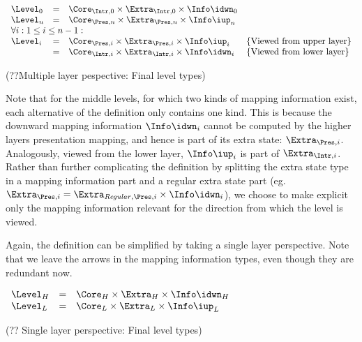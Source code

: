 \begin{small}\begin{align*}%
\end{align*} 
\(\begin{array}{lcll}
\Level_{0} & = & \Core_{\Intr,0} \times \Extra_{\Intr,0} \times \Info\idwn_{0} \\
\Level_{n} & = & \Core_{\Pres,n} \times \Extra_{\Pres,n} \times  \Info\iup_{n}\\
\lefteqn{\forall i:1 \le i \le n-1:}  \\
\Level_{i} & = & \Core_{\Pres,i} \times \Extra_{\Pres,i}  \times \Info\iup_{i} & \text{\{Viewed from upper layer\}}\\  
               & = & \Core_{\Intr,i} \times \Extra_{\Intr,i} \times \Info\idwn_{i} & \text{\{Viewed from lower layer\}}
\end{array}\)\end{small}
\begin{center}(??Multiple layer pespective: Final level types)\end{center}\vspace{1em}

Note that for the middle levels, for which two kinds of mapping information exist, each alternative of the definition only contains one kind. This is because the downward mapping information $\Info\idwn_{i}$ cannot be computed by the higher layers presentation mapping, and hence is part of its extra state: $\Extra_{\Pres,i}$. Analogously, viewed from the lower layer, $\Info\iup_{i}$ is part of $\Extra_{\Intr,i}$. Rather than further complicating the definition by splitting the extra state type in a mapping information part and a regular extra state part (eg. $\Extra_{\Pres,i} = \Extra_{\mathit{Regular},\Pres,i} \times \Info\idwn_{i}$), we choose to make explicit only the mapping information relevant for the direction from which the level is viewed.

Again, the definition can be simplified by taking a single layer perspective. Note that we leave the arrows in the  mapping information types, even though they are redundant now.

\begin{small}\(\begin{array}{lcll} \label{spec:extraStateSL}
\Level_{H} & = & \Core_{H} \times \Extra_{H} \times \Info\idwn_{H}\\
\Level_{L} & = & \Core_{L} \times \Extra_{L} \times \Info\iup_{L}\\
\end{array}\)\end{small}
\begin{center}(?? Single layer perspective: Final level types)\end{center}\vspace{1em}

